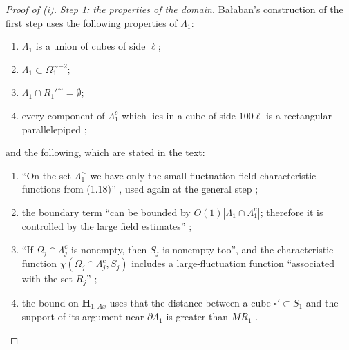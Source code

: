 \documentclass[11pt]{preprint}
\numberwithin{equation}{section}
\theoremstyle{definition}
\theoremstyle{remark}
\theoremstyle{plain}
\begin{document}
\begin{proof}[Proof of (i)]
\emph{Step 1: the properties of the domain.} Ba{\l}aban's construction of the first step uses the following properties of $\Lambda_1$:
\begin{enumerate}[label=(P\arabic*)]
\item $\Lambda_1$ is a union of cubes of side $\ell$;
\item $\Lambda_1 \subset \Omega_1^{\sim-2}$;
\item $\Lambda_1 \cap R_1'^{\sim} = \emptyset$;
\item every component of $\Lambda_1^c$ which lies in a cube of side $100\ell$ is a rectangular parallelepiped \cite[p.~251, and after (2.3), p.~255]{BalabanCRE};
\end{enumerate}
and the following, which are stated in the text:
\begin{enumerate}[label=($\alph*$)]
\item[($\alpha$)] ``On the set $\Lambda_1^{\sim}$ we have only the small fluctuation field characteristic functions from (1.18)'' \cite[p.~251]{BalabanCRE}, used again at the general step \cite[p.~269]{BalabanCRE};
\item[($\beta$)] the boundary term ``can be bounded by $O(1)|\Lambda_1\cap\Lambda_1^c|$; therefore it is controlled by the large field estimates'' \cite[p.~253]{BalabanCRE};
\item[($\gamma$)] ``If $\Omega_j\cap\Lambda_j^c$ is nonempty, then $S_j$ is nonempty too'', and the characteristic function $\chi(\Omega_j\cap\Lambda_j^c,S_j)$ includes a large-fluctuation function ``associated with the set $R_j$'' \cite[p.~255]{BalabanCRE};
\item[($\delta$)] the bound on $\mathbf H_{1,Ax}$ uses that the distance between a cube $\square' \subset S_1$ and the support of its argument near $\partial\Lambda_1$ is greater than $MR_1$ \cite[p.~251]{BalabanCRE}.
\end{enumerate}

\end{proof}
\end{document}
